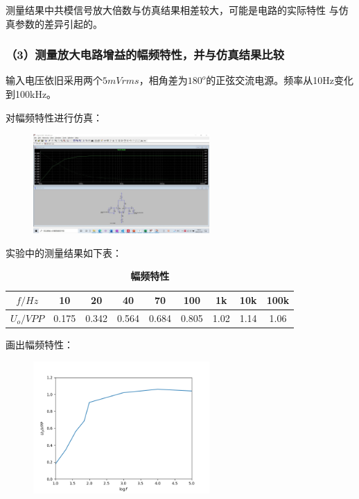 \documentclass[UTF8]{ctexart}
\begin{document}
测量结果中共模信号放大倍数与仿真结果相差较大，可能是电路的实际特性
与仿真参数的差异引起的。

\subsubsection*{（3）测量放大电路增益的幅频特性，并与仿真结果比较}

输入电压依旧采用两个$5mVrms$，相角差为$180^o$的正弦交流电源。频率从10Hz变化到100kHz。

对幅频特性进行仿真：

\begin{figure}[htbp]
    \centering
    \includegraphics[width=0.60\textwidth]{1-3-幅频特性.jpg}
\end{figure}

\newpage
实验中的测量结果如下表：

\begin{table}[H]
    \centering
    \caption{\label{表3}\textbf{幅频特性}}
    \begin{tabular}{ccccccccc}
    \toprule
        $f/Hz$ & 10 & 20 & 40 & 70 & 100 & 1k & 10k & 100k\\
    \midrule
         $U_{o}/VPP$ & 0.175 & 0.342 & 0.564 & 0.684 & 0.805 & 1.02 & 1.14 & 1.06\\ 
    \bottomrule
    \end{tabular}
\end{table}

画出幅频特性：
\begin{figure}[htbp]
    \centering
    \includegraphics[width=0.60\textwidth]{幅频特性.png}
\end{figure}
\end{document}
